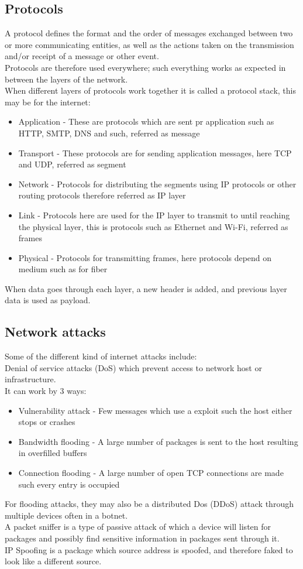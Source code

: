 \documentclass[12pt, a4paper]{article}
\begin{document}
		\subsection{Protocols}
			A protocol defines the format and the order of messages exchanged between two or more communicating entities, as well as the actions taken on the transmission and/or receipt of a message or other event.\\[4mm]
			Protocols are therefore used everywhere; such everything works as expected in between the layers of the network.\\
			When different layers of protocols work together it is called a protocol stack, this may be for the internet: 
			\begin{itemize}
				\item Application - These are protocols which are sent pr application such as HTTP, SMTP, DNS and such, referred as message
				\item Transport - These protocols are for sending application messages, here TCP and UDP, referred as segment
				\item Network - Protocols for distributing the segments using IP protocols or other routing protocols therefore referred as IP layer
				\item Link - Protocols here are used for the IP layer to transmit to until reaching the physical layer, this is protocols such as Ethernet and Wi-Fi, referred as frames
				\item Physical - Protocols for transmitting frames, here protocols depend on medium such as for fiber
			\end{itemize}
			When data goes through each layer, a new header is added, and previous layer data is used as payload.\\
		\subsection{Network attacks}
			Some of the different kind of internet attacks include:\\
			Denial of service attacks (DoS) which prevent access to network host or infrastructure.\\
			It can work by 3 ways:
			\begin{itemize}
				\item Vulnerability attack - Few messages which use a exploit such the host either stops or crashes
				\item Bandwidth flooding - A large number of packages is sent to the host resulting in overfilled buffers
				\item Connection flooding - A large number of open TCP connections are made such every entry is occupied
			\end{itemize}
			For flooding attacks, they may also be a distributed Dos  (DDoS) attack through multiple devices often in a botnet.\\[4mm]
			A packet sniffer is a type of passive attack of which a device will listen for packages and possibly find sensitive information in packages sent through it.\\
			IP Spoofing is a package which source address is spoofed, and therefore faked to look like a different source.\\
\end{document}
